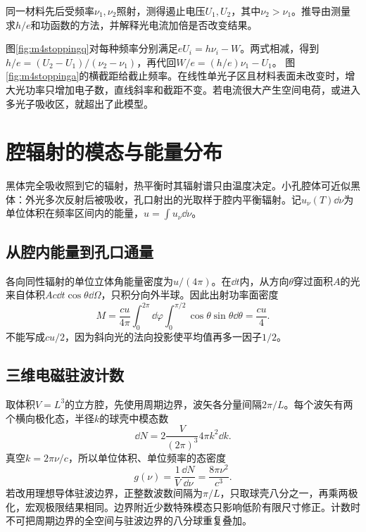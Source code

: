 \begin{example}\label{ex:m4stopping}
同一材料先后受频率$\nu_1,\nu_2$照射，测得遏止电压$U_1,U_2$，其中$\nu_2>\nu_1$。推导由测量求$h/e$和功函数的方法，并解释光电流加倍是否改变结果。
\end{example}
\begin{solution}
图\ref{fig:m4stoppingq}对每种频率分别满足$eU_i=h\nu_i-W$。两式相减，得到$h/e=(U_2-U_1)/(\nu_2-\nu_1)$，再代回$W/e=(h/e)\nu_1-U_1$。
图\ref{fig:m4stoppinga}的横截距给截止频率。在线性单光子区且材料表面未改变时，增大光功率只增加电子数，直线斜率和截距不变。若电流很大产生空间电荷，或进入多光子吸收区，就超出了此模型。
\end{solution}

\section{腔辐射的模态与能量分布}\label{th:m4modes}
黑体完全吸收照到它的辐射，热平衡时其辐射谱只由温度决定。小孔腔体可近似黑体：外光多次反射后被吸收，孔口射出的光取样于腔内平衡辐射。记$u_\nu(T)\dd\nu$为单位体积在频率区间内的能量，$u=\int u_\nu\dd\nu$。

\subsection{从腔内能量到孔口通量}
各向同性辐射的单位立体角能量密度为$u/(4\pi)$。在$\dd t$内，从方向$\theta$穿过面积$A$的光来自体积$Ac\dd t\cos\theta\dd\Omega$，只积分向外半球。因此出射功率面密度
\[
 M=\frac{cu}{4\pi}\int_0^{2\pi}\dd\varphi\int_0^{\pi/2}\cos\theta\sin\theta\dd\theta=\frac{cu}4.
\]
不能写成$cu/2$，因为斜向光的法向投影使平均值再多一因子$1/2$。

\subsection{三维电磁驻波计数}
取体积$V=L^3$的立方腔，先使用周期边界，波矢各分量间隔$2\pi/L$。每个波矢有两个横向极化态，半径$k$的球壳中模态数
\[
 \dd N=2\frac{V}{(2\pi)^3}4\pi k^2\dd k.
\]
真空$k=2\pi\nu/c$，所以单位体积、单位频率的态密度
\begin{equation}\label{eq:m4density}
 g(\nu)=\frac1V\frac{\dd N}{\dd\nu}=\frac{8\pi\nu^2}{c^3}.
\end{equation}
若改用理想导体驻波边界，正整数波数间隔为$\pi/L$，只取球壳八分之一，再乘两极化，宏观极限结果相同。边界附近少数特殊模态只影响低阶有限尺寸修正。计数时不可把周期边界的全空间与驻波边界的八分球重复叠加。

